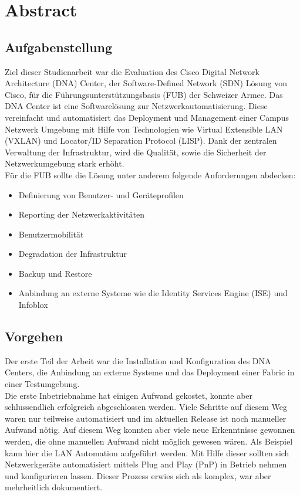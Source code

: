 \section{Abstract} 

\subsection{Aufgabenstellung} \label{Abstract}
Ziel dieser Studienarbeit war die Evaluation des Cisco Digital Network Architecture (DNA) Center, der Software-Defined Network (SDN) Lösung von Cisco, für die Führungsunterstützungsbasis (FUB) der Schweizer Armee. Das DNA Center ist eine Softwarelösung zur Netzwerkautomatisierung. Diese vereinfacht und automatisiert das Deployment und Management einer Campus Netzwerk Umgebung mit Hilfe von Technologien wie Virtual Extensible LAN (VXLAN) und Locator/ID Separation Protocol (LISP). Dank der zentralen Verwaltung der Infrastruktur, wird die Qualität, sowie die Sicherheit der Netzwerkumgebung stark erhöht.\\
Für die FUB sollte die Lösung unter anderem folgende Anforderungen abdecken:
\begin{itemize}
	\item Definierung von Benutzer- und Geräteprofilen
	\item Reporting der Netzwerkaktivitäten
	\item Benutzermobilität
	\item Degradation der Infrastruktur
	\item Backup und Restore
	\item Anbindung an externe Systeme wie die Identity Services Engine (ISE) und Infoblox
\end{itemize}

\subsection{Vorgehen}
Der erste Teil der Arbeit war die Installation und Konfiguration des DNA Centers, die Anbindung an externe Systeme und das Deployment einer Fabric in einer Testumgebung.\\

Die erste Inbetriebnahme hat einigen Aufwand gekostet, konnte aber schlussendlich erfolgreich abgeschlossen werden. Viele Schritte auf diesem Weg waren nur teilweise automatisiert und im aktuellen Release ist noch manueller Aufwand nötig. Auf diesem Weg konnten aber viele neue Erkenntnisse gewonnen werden, die ohne manuellen Aufwand nicht möglich gewesen wären. Als Beispiel kann hier die LAN Automation aufgeführt werden. Mit Hilfe dieser sollten sich Netzwerkgeräte automatisiert mittels Plug and Play (PnP) in Betrieb nehmen und konfigurieren lassen. Dieser Prozess erwies sich als komplex, war aber mehrheitlich dokumentiert. \\

